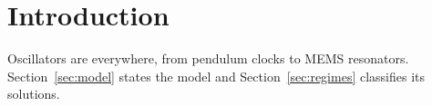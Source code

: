\section{Introduction}\label{sec:intro}
Oscillators are everywhere, from pendulum clocks to MEMS resonators.
Section~\ref{sec:model} states the model and Section~\ref{sec:regimes} classifies its solutions.

